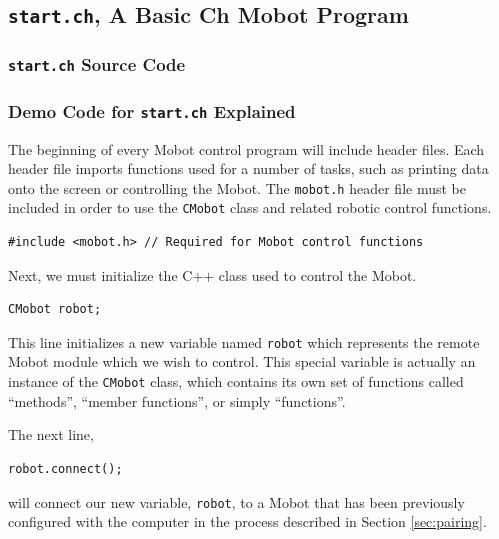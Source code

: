 \documentclass{article}
\begin{document}
\subsection{\texttt{start.ch}, A Basic Ch Mobot Program}
\subsubsection{\texttt{start.ch} Source Code}


\subsubsection{\label{sec:democode}Demo Code for \texttt{start.ch} Explained}
The beginning of every Mobot control program will include header files. Each
header file imports functions used for a number of tasks, such as printing
data onto the screen or controlling the Mobot. The \texttt{mobot.h} header
file must be included in order to use the \texttt{CMobot} class and related
robotic control functions.

\begin{verbatim}
#include <mobot.h> // Required for Mobot control functions
\end{verbatim}

Next, we must initialize the C++ class used to control the Mobot. 

\begin{verbatim}
CMobot robot;
\end{verbatim}

This line
initializes a new variable named \texttt{robot} which represents the remote
Mobot module which we wish to control. This special variable is actually an
instance of the \texttt{CMobot} class, which contains its own set of
functions called ``methods'', ``member functions'', or simply ``functions''.

The next line,
\begin{verbatim}
robot.connect();
\end{verbatim}
will connect our new variable, \texttt{robot}, to a
Mobot that has been previously configured with the computer in the 
process described in Section \ref{sec:pairing}.
\end{document}
